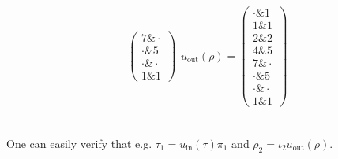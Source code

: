 \begin{example}
\begin{minipage}[t]{.5\textwidth}
\begin{align*}
\begin{array}{rr}
\begin{pmatrix}
7 \ampersand \cdot \\
\cdot \ampersand 5 \\
\cdot \ampersand \cdot \\
1 \ampersand 1
\end{pmatrix}
\end{array}
u_{\text{out}}(\rho) = \begin{pmatrix}
\cdot \ampersand 1 \\
1 \ampersand 1 \\
2 \ampersand 2 \\
4 \ampersand 5 \\
7 \ampersand \cdot \\
\cdot \ampersand 5 \\
\cdot \ampersand \cdot \\
1 \ampersand 1
\end{pmatrix}
\end{align*}
\end{minipage}\\

\noindent One can easily verify that e.g. $\tau_{1} = u_{\mathrm{in}}(\tau) \pi_{1}$ and $\rho_{2} = \iota_{2} u_{\mathrm{out}}(\rho)$.
\end{example}



